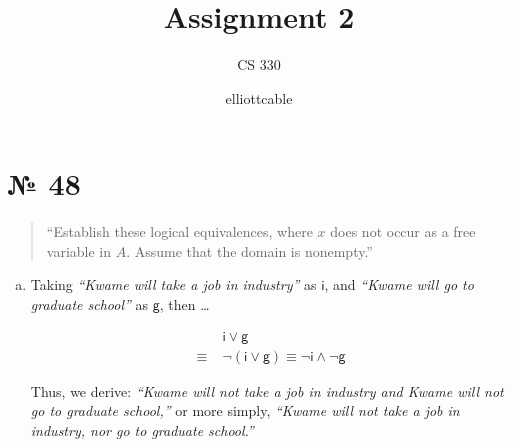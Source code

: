 \documentclass[
   paper=a4,
   fontsize=11pt,
   parskip=no,       %
   fleqn             %
]{scrartcl}
\title{Assignment 2}
\subtitle{CS 330}
\author{elliottcable}
\begin{document}
\maketitle

\section*{№ 48}
\begin{quote}{\sffamily
   “Establish these logical equivalences, where $\mathit{x}$ does not occur as a free variable in $\mathit{A}$.
   Assume that the domain is nonempty.”
}\end{quote}

\begin{multicols}{2}
\begin{enumerate}[a.]
\raggedcolumns
   \item
   Taking \textit{“Kwame will take a job in industry”} as $\bm{\mathsf{i}}$, and \textit{“Kwame will
   go to graduate school”} as $\bm{\mathsf{g}}$, then …

   \begin{align*}
    & \mathsf{i \vee g}                                              \\\equiv\;
    & \mathsf{¬(i \vee g) \equiv ¬i \wedge ¬g}
   \end{align*}

   Thus, we derive: \textit{“Kwame will not take a job in industry and Kwame will not go to graduate
   school,”} or more simply, \textit{“Kwame will not take a job in industry, nor go to graduate
   school.”}
   
\columnbreak

\end{enumerate}
\end{multicols}
\end{document}

